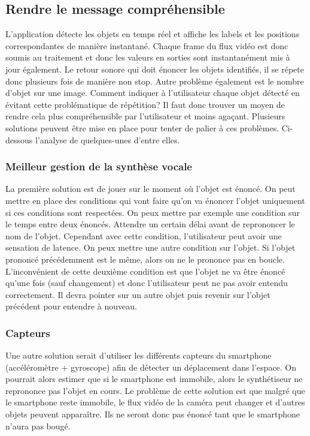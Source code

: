 \documentclass[UTF8]{EPURapport}
\begin{document}
\subsection{Rendre le message compréhensible}
L'application détecte les objets en temps réel et affiche les labels et les positions correspondantes de manière instantané. Chaque frame du flux vidéo est donc soumis au traitement et donc les valeurs en sorties sont instantanément mis à jour également. Le retour sonore qui doit énoncer les objets identifiés, il se répete donc plusieurs fois de manière non stop. Autre problème également est le nombre d'objet sur une image. Comment indiquer à l'utilisateur chaque objet détecté en évitant cette problématique de répétition? Il faut donc trouver un moyen de rendre cela plus compréhensible par l'utilisateur et moins agaçant. Plusieurs solutions peuvent être mise en place pour tenter de palier à ces problèmes. Ci-dessous l'analyse de quelques-unes d'entre elles. 

\subsubsection{Meilleur gestion de la synthèse vocale}
La première solution est de jouer sur le moment où l'objet est énoncé. On peut mettre en place des conditions qui vont faire qu'on va énoncer l'objet uniquement si ces conditions sont respectées. On peux mettre par exemple une condition sur le temps entre deux énoncés. Attendre un certain délai avant de reprononcer le nom de l'objet. Cependant avec cette condition, l'utilisateur peut avoir une sensation de latence. On peux mettre une autre condition sur l'objet. Si l'objet prononcé précédemment est le même, alors on ne le prononce pas en boucle. L'inconvénient de cette deuxième condition est que l'objet ne va être énoncé qu'une fois (sauf changement) et donc l'utilisateur peut ne pas avoir entendu correctement. Il devra pointer sur un autre objet puis revenir sur l'objet précédent pour entendre à nouveau. 
\subsubsection{Capteurs}
Une autre solution serait d'utiliser les différents capteurs du smartphone (accéléromètre + gyroscope) afin de détecter un déplacement dans l'espace. On pourrait alors estimer que si le smartphone est immobile, alors le synthétiseur ne reprononce pas l'objet en cours. Le problème de cette solution est que malgré que le smartphone reste immobile, le flux vidéo de la caméra peut changer et d'autres objets peuvent apparaître. Ils ne seront donc pas énoncé tant que le smartphone n'aura pas bougé.
\end{document}
